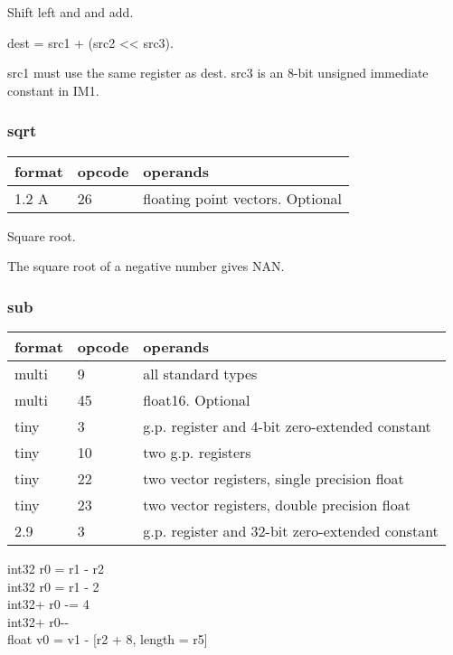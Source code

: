\documentclass[forwardcom.tex]{subfiles}
\begin{document}
Shift left and and add. 
\vspace{2mm}

dest = src1 + (src2 \textless\textless{}  src3).
\vspace{2mm}

src1 must use the same register as dest. src3 is an 8-bit unsigned immediate constant in IM1.
\vspace{2mm}

\subsubsection{sqrt}
\label{table:sqrtInstruction}
\begin{tabular}{|p{12mm}|p{12mm}|p{110mm}|}
\hline
\bfseries format & \bfseries opcode & \bfseries operands \\ \hline
1.2 A & 26 & floating point vectors. Optional \\ \hline
\end{tabular}
\vspace{2mm}

Square root.
\vspace{2mm}

The square root of a negative number gives NAN.

\subsubsection{sub}
\label{table:subInstruction}
\begin{tabular}{|p{12mm}|p{12mm}|p{110mm}|}
\hline
\bfseries format & \bfseries opcode & \bfseries operands \\ \hline
multi &  9 & all standard types \\ \hline
multi & 45 & float16. Optional \\ \hline
tiny  &  3 & g.p. register and 4-bit zero-extended constant \\ \hline
tiny  & 10 & two g.p. registers \\ \hline
tiny  & 22 & two vector registers, single precision float \\ \hline
tiny  & 23 & two vector registers, double precision float \\ \hline
2.9   &  3 & g.p. register and 32-bit zero-extended constant \\ \hline
\end{tabular}
\vspace{2mm}

int32 r0 = r1 - r2 \\
int32 r0 = r1 - 2 \\
int32+ r0 -= 4 \\
int32+ r0-{-} \\
float v0 = v1 - [r2 + 8, length = r5]
\vspace{2mm}
\end{document}
